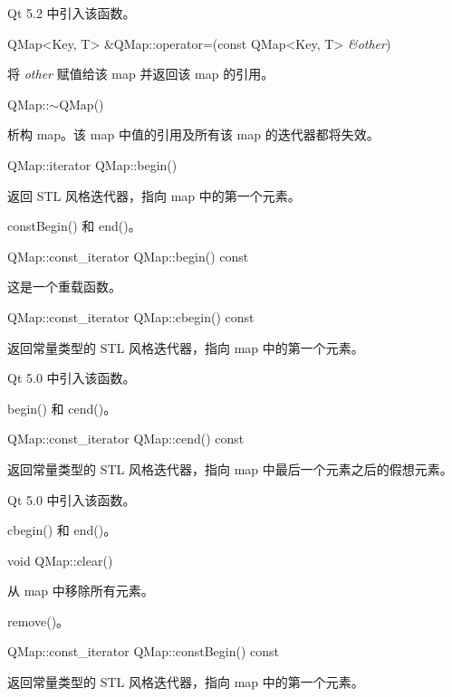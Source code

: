Qt 5.2 中引入该函数。

\splitLine

QMap<Key, T> \&QMap::operator=(const QMap<Key, T> \emph{\&other})

将 \emph{other} 赋值给该 map 并返回该 map 的引用。

QMap::$\sim$QMap()

析构 map。该 map 中值的引用及所有该 map 的迭代器都将失效。

\splitLine

QMap::iterator QMap::begin()

返回 STL 风格迭代器，指向 map 中的第一个元素。

\begin{notice}[另请参阅]
constBegin() 和 end()。
\end{notice}

\splitLine

QMap::const\_iterator QMap::begin() const

这是一个重载函数。

\splitLine

QMap::const\_iterator QMap::cbegin() const

返回常量类型的 STL 风格迭代器，指向 map 中的第一个元素。

Qt 5.0 中引入该函数。

\begin{notice}[另请参阅]
begin() 和 cend()。
\end{notice}

\splitLine

QMap::const\_iterator QMap::cend() const

返回常量类型的 STL 风格迭代器，指向 map 中最后一个元素之后的假想元素。

Qt 5.0 中引入该函数。

\begin{notice}[另请参阅]
cbegin() 和 end()。
\end{notice}

\splitLine

void QMap::clear()

从 map 中移除所有元素。

\begin{notice}[另请参阅]
remove()。
\end{notice}

\splitLine

QMap::const\_iterator QMap::constBegin() const

返回常量类型的 STL 风格迭代器，指向 map 中的第一个元素。

